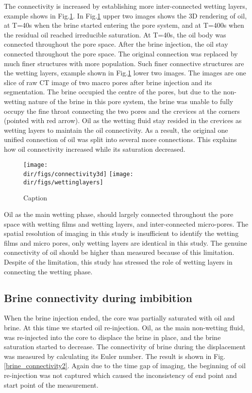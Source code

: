 The connectivity is increased by establishing more inter-connected wetting layers, example shows in Fig.\ref{wettinglayers}. In Fig.\ref{wettinglayers} upper two images shows the 3D rendering of oil, at T=40s when the brine started entering the pore system, and at T=400s when the residual oil reached irreducible saturation. At T=40s, the oil body was connected throughout the pore space. After the brine injection, the oil stay connected throughout the pore space. The original connection was replaced by much finer structures with more population. Such finer connective structures are the wetting layers, example shown in Fig.\ref{wettinglayers} lower two images. The images are one slice of raw CT image of two macro pores after brine injection and its segmentation. The brine occupied the centre of the pores, but due to the non-wetting nature of the brine in this pore system, the brine was unable to fully occupy the fine throat connecting the two pores and the crevices at the corners (pointed with red arrow). Oil as the wetting fluid stay resided in the crevices as wetting layers to maintain the oil connectivity. As a result, the original one unified connection of oil was split into several more connections. This explains how oil connectivity increased while its saturation decreased.   

\begin{figure}
    \centering
    \texttt{[image: \\dir/figs/connectivity3d]}
    \texttt{[image: \\dir/figs/wettinglayers]}
    \caption{Caption}   
    \label{wettinglayers}
\end{figure}

Oil as the main wetting phase, should largely connected throughout the pore space with wetting films and wetting layers, and inter-connected micro-pores. The spatial resolution of imaging in this study is insufficient to identify the wetting films and micro pores, only wetting layers are identical in this study. The genuine connectivity of oil should be higher than measured because of this limitation. Despite of the limitation, this study has stressed the role of wetting layers in connecting the wetting phase.

\subsection{Brine connectivity during imbibition}

When the brine injection ended, the core was partially saturated with oil and brine. At this time we started oil re-injection. Oil, as the main non-wetting fluid, was re-injected into the core to displace the brine in place, and the brine saturation started to decrease. The connectivity of brine during the displacement was measured by calculating its Euler number. The result is shown in Fig.\ref{brine_connectivity2}. Again due to the time gap of imaging, the beginning of oil re-injection was not captured which caused the inconsistency of end point and start point of the measurement. 

